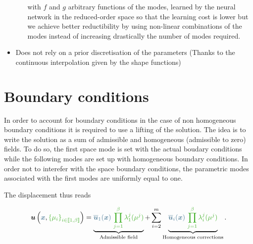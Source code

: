 \begin{itemize}
\begin{itemize}
        with $f$ and $g$ arbitrary functions of the modes, learned by the neural network in the reduced-order space so that the learning cost is lower but we achieve better reductibility by using non-linear combinations of the modes instead of increasing drastically the number of modes required.
    \end{itemize}
    \item[\textcolor{LGreenLMS}{\faCheckCircle }] Does not rely on a prior discretisation of the parameters (Thanks to the continuous interpolation given by the shape functions)
\end{itemize}


\section{Boundary conditions}
\label{BCs_TD}




In order to account for boundary conditions in the case of non homogeneous boundary conditions it is required to use a lifting of the solution. The idea is to write the solution as a sum of admissible and homogeneous (admissible to zero) fields.
To do so, the first space mode is set with the actual boudary conditions while the following modes are set up with homogeneous boundary conditions. In order not to interefer with the space boundary conditions, the parametric modes associated with the first modes are uniformly equal to one.

The displacement thus reads


    \begin{equation}
        \vect{u}\left(\textcolor{BleuLMS!70}{\vect{x}}, \textcolor{LGreenLMS}{\left\{\mu_i\right\}_{i \in \llbracket 1, \beta \rrbracket}}\right) = \underbrace{\textcolor{BleuLMS!70}{\overline{\vect{u}}_1(\vect{x})} ~\textcolor{LGreenLMS}{\prod_{j=1}^{\beta}\lambda_1^j(\mu^j)} }_{\text{Admissible field}}+ \sum\limits_{i=2}^m \underbrace{\textcolor{BleuLMS!70}{\overline{\vect{u}}_i(\vect{x})} ~\textcolor{LGreenLMS}{\prod_{j=1}^{\beta}\lambda_i^j(\mu^j)}}_{\text{Homogeneous corrections}}.
    \end{equation}


